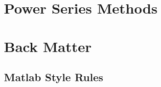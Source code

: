\documentclass{tufte-book}
\theoremstyle{break}
\begin{document}
\part{Power Series Methods}



\part{Back Matter}
\backmatter





\appendix
\appendixpage
\noappendicestocpagenum
\addappheadtotoc



\chapter{Matlab Style Rules}
\end{document}
